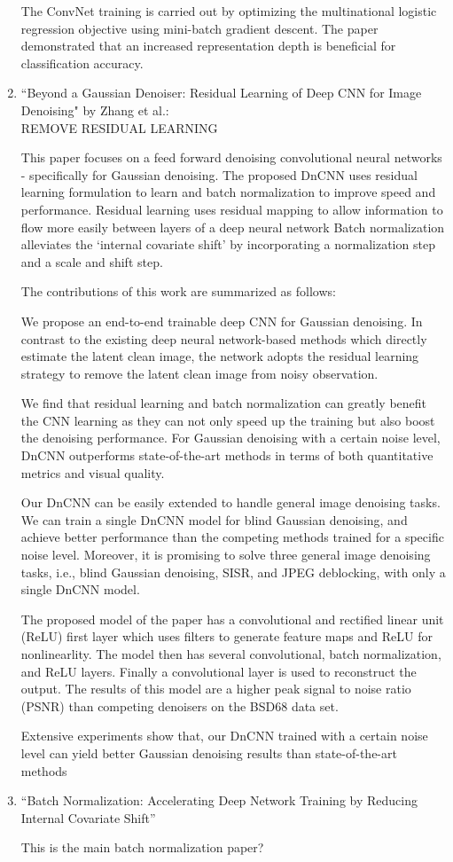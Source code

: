 \documentclass[12pt, titlepage]{article}
\begin{document}
\begin{enumerate}
	The ConvNet training is carried out by optimizing the multinational logistic regression objective using mini-batch gradient descent. The paper demonstrated that an increased representation depth is beneficial for classification accuracy.
	
	\item ``Beyond a Gaussian Denoiser: Residual Learning of Deep CNN for Image Denoising" by Zhang et al.\citep{zhang2017beyond}:\\
	
	REMOVE RESIDUAL LEARNING
	
	This paper focuses on a feed forward denoising convolutional neural networks - specifically for Gaussian denoising. The proposed DnCNN uses residual learning formulation to learn and batch normalization to improve speed and performance. Residual learning uses residual mapping to allow information to flow more easily between layers of a deep neural network
	Batch normalization alleviates the `internal covariate shift' by incorporating a normalization step and a scale and shift step.
	
	The contributions of this work are summarized as follows:
	
	We propose an end-to-end trainable deep CNN for Gaussian denoising. In contrast to the existing deep neural network-based methods which directly estimate the latent clean image, the network adopts the residual learning strategy to remove the latent clean image from noisy observation.
	
	We find that residual learning and batch normalization can greatly benefit the CNN learning as they can not only speed up the training but also boost the denoising performance. For Gaussian denoising with a certain noise level, DnCNN outperforms state-of-the-art methods in terms of both quantitative metrics and visual quality.
	
	Our DnCNN can be easily extended to handle general image denoising tasks. We can train a single DnCNN model for blind Gaussian denoising, and achieve better performance than the competing methods trained for a specific noise level. Moreover, it is promising to solve three general image denoising tasks, i.e., blind Gaussian denoising, SISR, and JPEG deblocking, with only a single DnCNN model.
	
	 The proposed model of the paper has a convolutional and rectified linear unit (ReLU) first layer which uses filters to generate feature maps and ReLU for nonlinearlity. The model then has several convolutional, batch normalization, and ReLU layers. Finally a convolutional layer is used to reconstruct the output. The results of this model are a higher peak signal to noise ratio (PSNR) than competing denoisers on the BSD68 data set. 
	
	Extensive experiments show that, our DnCNN trained with a certain noise level can yield better Gaussian denoising results than state-of-the-art methods 
	
	\item ``Batch Normalization: Accelerating Deep Network Training by Reducing Internal Covariate Shift''
	
	This is the main batch normalization paper?
\end{enumerate}
\end{document}
